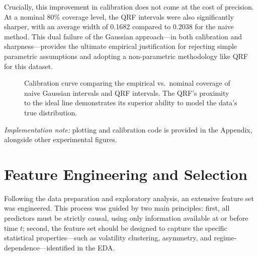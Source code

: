 \documentclass[
  a4paper,
  DIV=11,
  numbers=noendperiod]{scrreprt}
\begin{document}
Crucially, this improvement in calibration does not come at the cost of
precision. At a nominal 80\% coverage level, the QRF intervals were also
significantly sharper, with an average width of 0.1682 compared to
0.2038 for the naive method. This dual failure of the Gaussian
approach---in both calibration and sharpness---provides the ultimate
empirical justification for rejecting simple parametric assumptions and
adopting a non-parametric methodology like QRF for this dataset.

\begin{figure}


\caption{\label{fig-calibration-curve}Calibration curve comparing the
empirical vs.~nominal coverage of naive Gaussian intervals and QRF
intervals. The QRF's proximity to the ideal line demonstrates its
superior ability to model the data's true distribution.}

\end{figure}%

\emph{Implementation note:} plotting and calibration code is provided in
the Appendix, alongside other experimental figures.

\section{Feature Engineering and
Selection}\label{feature-engineering-and-selection}

Following the data preparation and exploratory analysis, an extensive
feature set was engineered. This process was guided by two main
principles: first, all predictors must be strictly causal, using only
information available at or before time \(t\); second, the feature set
should be designed to capture the specific statistical properties---such
as volatility clustering, asymmetry, and regime-dependence---identified
in the EDA.
\end{document}
